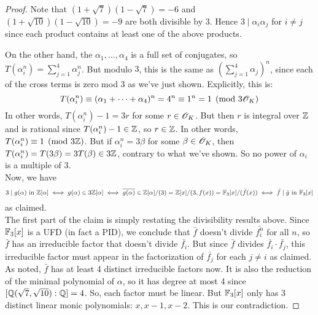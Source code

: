 \begin{proof}
	Note that $(1+\sqrt{7})(1-\sqrt{7}) = -6$ and $(1+\sqrt{10})(1-\sqrt{10}) = -9$ are both divisible by 3. Hence $3 \mid \alpha_i\alpha_j$ for $i \neq j$ since each product contains at least one of the above products.
	
	On the other hand, the $\alpha_1,\ldots,\alpha_4$ is a full set of conjugates, so $T(\alpha_i^n) = \sum_{j=1}^4 \alpha_j^n$. But modulo $3$, this is the same as $(\sum_{j=1}^4 \alpha_j)^n$, since each of the cross terms is zero mod 3 as we've just shown. Explicitly, this is:
	\[ T(\alpha_i^n) \equiv (\alpha_1+\cdots+\alpha_4)^n = 4^n \equiv 1^n = 1 \pmod{3\mathscr{O}_K} \]
	In other words, $T(\alpha_i^n)-1 = 3r$ for some $r \in \mathscr{O}_K$. But then $r$ is integral over $\mathbb{Z}$ and is rational since $T(\alpha_i^n)-1 \in \mathbb{Z}$, so $r \in \mathbb{Z}$. In other words, $T(\alpha_i^n) \equiv 1 \pmod{3\mathbb{Z}}$. But if $\alpha_i^n = 3\beta$ for some $\beta \in \mathscr{O}_K$, then $T(\alpha_i^n) = T(3\beta) = 3T(\beta) \in 3\mathbb{Z}$, contrary to what we've shown. So no power of $\alpha_i$ is a multiple of 3. \\
	
	Now, we have
	\[ 3 \mid g(\alpha) \text{ in }\mathbb{Z}[\alpha] \iff g(\alpha) \in 3\mathbb{Z}[\alpha] \iff \overline{g(\alpha)} \in \mathbb{Z}[\alpha]/(3) = \mathbb{Z}[x]/(3,f(x)) = \mathbb{F}_3[x]/(\bar{f}(x)) \iff \bar{f} \mid \bar{g} \text{ in } \mathbb{F}_3[x] \]
	as claimed. \\
	
	The first part of the claim is simply restating the divisibility results above. Since $\mathbb{F}_3[x]$ is a UFD (in fact a PID), we conclude that $\bar{f}$ doesn't divide $\bar{f_i^n}$ for all $n$, so $\bar{f}$ has an irreducible factor that doesn't divide $\bar{f_i}$. But since $\bar{f}$ divides $\bar{f_i}\cdot\bar{f_j}$, this irreducible factor must appear in the factorization of $\bar{f_j}$ for each $j \neq i$ as claimed. \\
	
	As noted, $\bar{f}$ has at least 4 distinct irreducible factors now. It is also the reduction of the minimal polynomial of $\alpha$, so it has degree at most 4 since $[\mathbb{Q}(\sqrt{7},\sqrt{10}):\mathbb{Q}] = 4$. So, each factor must be linear. But $\mathbb{F}_3[x]$ only has 3 distinct linear monic polynomials: $x,x-1,x-2$. This is our contradiction.
\end{proof}
